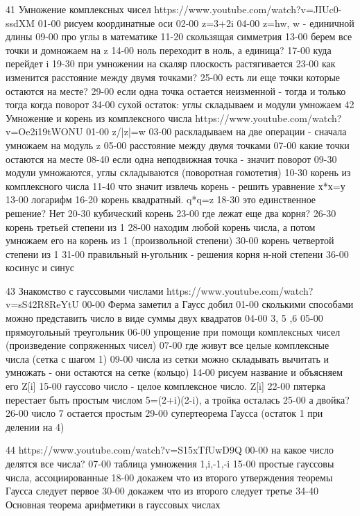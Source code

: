 41
Умножение комплексных чисел
https://www.youtube.com/watch?v=JIUc0-ssdXM
01-00 рисуем координатные оси
02-00 z=3+2i
04-00 z=hw, w - единичной длины
09-00 про углы в математике
11-20 скользящая симметрия
13-00 берем все точки и домножаем на z
14-00 ноль переходит в ноль, а единица?
17-00 куда перейдет i
19-30 при умножении на скаляр плоскость растягивается
23-00 как изменится расстояние между двумя точками?
25-00 есть ли еще точки которые остаются на месте?
29-00 если одна точка остается неизменной - тогда и только тогда когда поворот
34-00 сухой остаток: углы складываем и модули умножаем
42
Умножение и корень из комплексного числа
https://www.youtube.com/watch?v=Oe2i19tWONU
01-00 z/|z|=w
03-00 раскладываем на две операции - сначала умножаем на модуль z
05-00 расстояние между двумя точками
07-00 какие точки остаются на месте
08-40 если одна неподвижная точка - значит поворот
09-30 модули умножаются, углы складываются (поворотная гомотетия)
10-30 корень из комплексного числа
11-40 что значит извлечь корень - решить уравнение х*х=у
13-00 логарифм
16-20 корень квадратный. q*q=z
18-30 это единственное решение? Нет
20-30 кубический корень
23-00 где лежат еще два корня?
26-30 корень третьей степени из 1
28-00 находим любой корень числа, а потом умножаем его на корень из 1 (произвольной степени)
30-00 корень четвертой степени из 1
31-00 правильный н-угольник - решения корня н-ной степени
36-00 косинус и синус

43
Знакомство с гауссовыми числами
https://www.youtube.com/watch?v=sS42R8ReYtU
00-00 Ферма заметил а Гаусс добил
01-00 сколькими способами можно представить число в виде суммы двух квадратов
04-00 3, 5 ,6
05-00 прямоугольный треугольник
06-00 упрощение при помощи комплексных чисел (произведение сопряженных чисел)
07-00 где живут все целые комплексные числа (сетка с шагом 1)
09-00 числа из сетки можно складывать вычитать и умножать - они остаются на сетке (кольцо)
14-00 рисуем название и объясняем его Z[i]
15-00 гауссово число - целое комплексное число. Z[i]
22-00 пятерка перестает быть простым числом 5=(2+i)(2-i), а тройка осталась
25-00 а двойка?
26-00 число 7 остается простым
29-00 супертеорема Гаусса (остаток 1 при делении на 4)

44
https://www.youtube.com/watch?v=S15xTfUwD9Q
00-00 на какое число делятся все числа?
07-00 таблица умножения 1,i,-1,-i
15-00 простые гауссовы числа, ассоциированные
18-00 докажем что из второго утверждения теоремы Гаусса следует первое
30-00 докажем что из второго следует третье
34-40 Основная теорема арифметики в гауссовых числах

